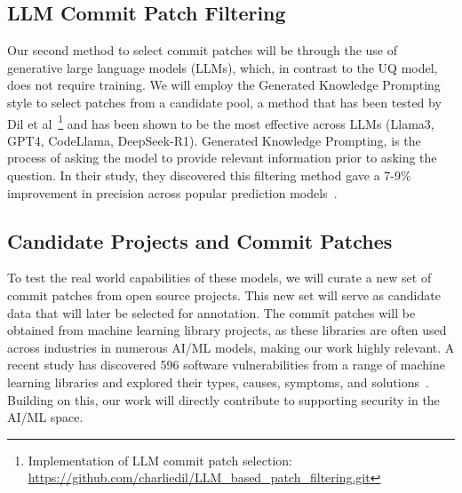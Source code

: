 \subsection{LLM Commit Patch Filtering}
\done{}

Our second method to select commit patches will be through the use of generative large language models (LLMs), which, in contrast to the UQ model, does not require training. We will employ the Generated Knowledge Prompting style to select patches from a candidate pool, a method that has been tested by Dil et al~\cite{dil2025}\footnote{Implementation of LLM commit patch selection: \url{https://github.com/charliedil/LLM_based_patch_filtering.git}} and has been shown to be the most effective across LLMs (Llama3, GPT4, CodeLlama, DeepSeek-R1). Generated Knowledge Prompting, is the process of asking the model to provide relevant information prior to asking the question. In their study, they discovered this filtering method gave a 7-9\% improvement in precision across popular prediction models~\cite{dil2025}.

\subsection{Candidate Projects and Commit Patches}
\done{}

To test the real world capabilities of these models, we will curate a new set of commit patches from open source projects. This new set will serve as candidate data that will later be selected for annotation. The commit patches will be obtained from machine learning library projects, as these libraries are often used across industries in numerous AI/ML models, making our work highly relevant. A recent study has discovered 596 software vulnerabilities from a range of machine learning libraries and explored their types, causes, symptoms, and solutions~\cite{harzevili2023characterizing}. Building on this, our work will directly contribute to supporting security in the AI/ML space.

